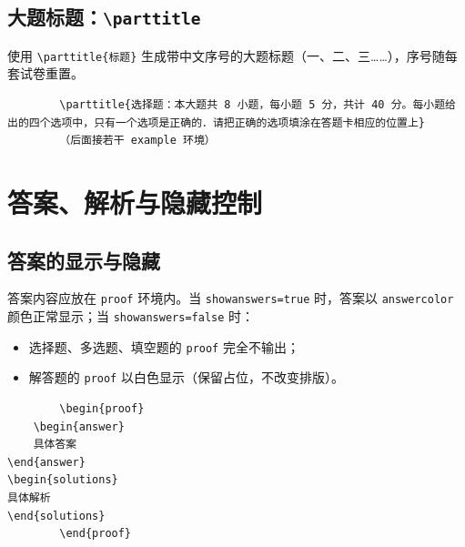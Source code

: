 \documentclass[
showanswers,        %
answercolor=red,    %
numbercolor=blue,   %
paper=a3,           %
nojuemi,              %
nozhuyishixiang,      %
example,        %
]{biscuits}
\begin{document}
	\section{大题标题：\texttt{\textbackslash parttitle}}
	
	使用 \verb|\parttitle{标题}| 生成带中文序号的大题标题（一、二、三……），序号随每套试卷重置。
	
	
	\begin{verbatim}
		\parttitle{选择题：本大题共 8 小题，每小题 5 分，共计 40 分。每小题给出的四个选项中，只有一个选项是正确的．请把正确的选项填涂在答题卡相应的位置上}
		（后面接若干 example 环境）
	\end{verbatim}
	
	\newpage
	
	\chapter{答案、解析与隐藏控制}
	
	\section{答案的显示与隐藏}
	
	答案内容应放在 \texttt{proof} 环境内。当 \texttt{showanswers=true} 时，答案以 \texttt{answercolor} 颜色正常显示；当 \texttt{showanswers=false} 时：
	\begin{itemize}
		\item 选择题、多选题、填空题的 \texttt{proof} 完全不输出；
		\item 解答题的 \texttt{proof} 以白色显示（保留占位，不改变排版）。
	\end{itemize}
	
	\begin{verbatim}
		\begin{proof}
	\begin{answer}
	具体答案		
\end{answer}		
\begin{solutions}
具体解析
\end{solutions}	
		\end{proof}
	\end{verbatim}
	
\end{document}
